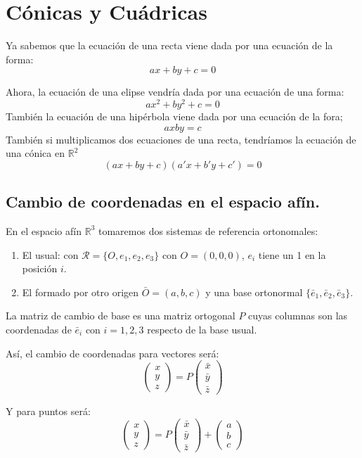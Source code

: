 \documentclass[11pt, a4paper]{article}
\newif\IfInSansMode
\newcommand{\R}{\mathbb{R}}
\theoremstyle{theorem-style}
\theoremstyle{definition-style}
\theoremstyle{remark-style}
\theoremstyle{example-style}
\newenvironment{nlist}
{\begin{enumerate}
    \renewcommand\labelenumi{(\emph{\roman{enumi})}}}
  {\end{enumerate}}
\begin{document}
\newpage

\section{Cónicas y Cuádricas}
Ya sabemos que la ecuación de una recta viene dada por una ecuación de la forma:
\[
ax + by +c = 0
\]

Ahora, la ecuación de una elipse vendría dada por una ecuación de una forma:
\[
ax^2 + by^2 + c = 0
\]
También la ecuación de una hipérbola viene dada por una ecuación de la fora;
\[
axby = c
\]
También si multiplicamos dos ecuaciones de una recta, tendríamos la ecuación de una cónica en $\R^2$
\[
(ax + by +c)(a'x+b'y+c') = 0
\]

\subsection{Cambio de coordenadas en el espacio afín.}

En el espacio afín $\R^3$ tomaremos dos sistemas de referencia ortonomales:
\begin{nlist}
	\item El usual: con $\mathcal R = \{O, e_1, e_2, e_3\}$ con $O=(0,0,0)$, $e_i$ tiene un 1 en la posición $i$.
	\item El formado por otro origen $\bar O = (a,b,c)$ y una base ortonormal $\{\bar e_1, \bar e_2, \bar e_3\}$. 
\end{nlist}

La matriz de cambio de base es una matriz ortogonal $P$ cuyas columnas son las coordenadas de $\bar e_i$ con $i=1,2,3$ respecto de la base usual.

Así, el cambio de coordenadas para vectores será:
\[
\begin{pmatrix}
x\\
y\\
z
\end{pmatrix}  = P \begin{pmatrix}
\bar x\\
\bar y\\
\bar z
\end{pmatrix} 
\]

Y para puntos será:
\[
\begin{pmatrix}
x\\
y\\
z
\end{pmatrix} = P \begin{pmatrix}
\bar x\\
\bar y\\
\bar z
\end{pmatrix}  + \begin{pmatrix}
 a\\ 
 b\\
 c
\end{pmatrix} 
\]
\end{document}
